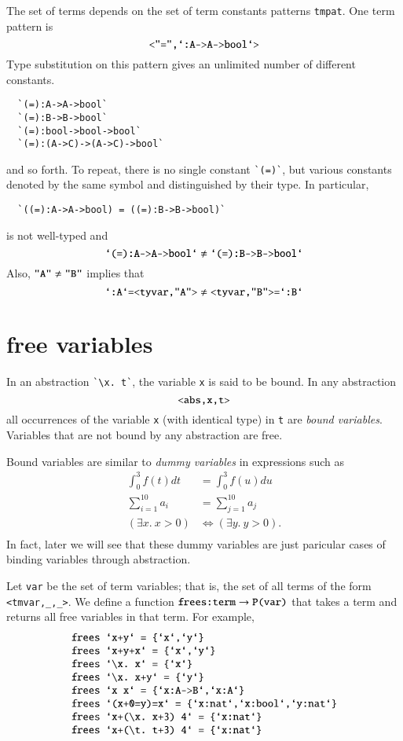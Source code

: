 The set of terms depends on the set of term constants patterns \verb!tmpat!.  One term pattern is
$$
\verb!<"=",`:A->A->bool`>!
$$
Type substitution on this pattern gives an unlimited number of different constants.
\begin{verbatim}
  `(=):A->A->bool`
  `(=):B->B->bool`
  `(=):bool->bool->bool`
  `(=):(A->C)->(A->C)->bool`
\end{verbatim}
and so forth.  To repeat, there is no single constant \verb!`(=)`!, but various constants denoted by the same symbol and distinguished by their type.
In particular,
\begin{verbatim}
  `((=):A->A->bool) = ((=):B->B->bool)`
\end{verbatim}
is not well-typed and
$$
\verb!`(=):A->A->bool`! \ne \verb!`(=):B->B->bool`!
$$
Also,
$\verb!"A"!\ne \verb!"B"!$ implies that
$$
\verb!`:A`=<tyvar,"A">!\ne\verb!<tyvar,"B">=`:B`!
$$ 
\section{free variables}

In an abstraction \verb!`\x. t`!, the variable \verb!x! is said to be
bound.  In any abstraction
$$
\verb!<abs,x,t>!
$$
all occurrences of the variable \verb!x! (with identical type) in \verb!t! are {\it bound variables}.  Variables that are not bound by any abstraction are free.

Bound variables are similar to {\it dummy variables} in expressions such as 
$$
\begin{array}{lll}
\int_0^3 f(t) dt &= \int_0^3 f(u) du\\
\sum_{i=1}^{10} a_i &= \sum_{j=1}^{10} a_j\\
(\exists x.~x>0)  &\Leftrightarrow (\exists y.~y>0).\\
\end{array}
$$
In fact, later we will see that these dummy variables are just paricular cases of binding variables through abstraction.

Let \verb!var! be the set of term variables; that is, the
set of all terms of the form \verb!<tmvar,_,_>!.
We define a function $\verb!frees:term!\to \verb!P(var)!$
that takes a term and returns all free variables in that term.  For example,
$$
\begin{array}{lll}
\verb!frees `x+y` = {`x`,`y`}!\\
\verb!frees `x+y+x` = {`x`,`y`}!\\
\verb!frees `\x. x` = {`x`}!\\
\verb!frees `\x. x+y` = {`y`}!\\
\verb!frees `x x` = {`x:A->B`,`x:A`}!\\
\verb!frees `(x+0=y)=x` = {`x:nat`,`x:bool`,`y:nat`}!\\
\verb!frees `x+(\x. x+3) 4` = {`x:nat`}!\\
\verb!frees `x+(\t. t+3) 4` = {`x:nat`}!\\
\end{array}
$$

